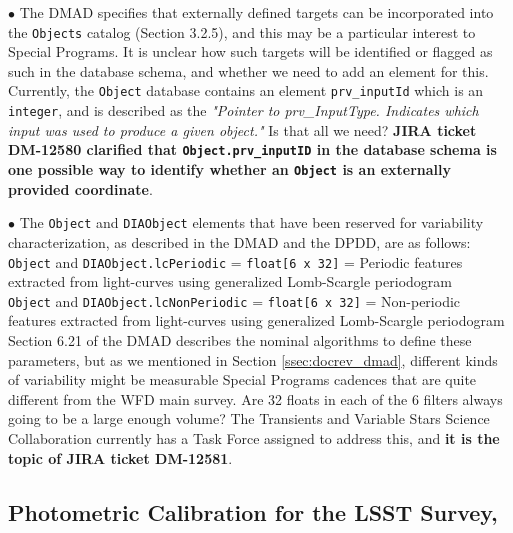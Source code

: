 $\bullet$ The DMAD specifies that externally defined targets can be incorporated into the \texttt{Objects} catalog (Section 3.2.5), and this may be a particular interest to Special Programs. It is unclear how such targets will be identified or flagged as such in the database schema, and whether we need to add an element for this. Currently, the \texttt{Object} database contains an element \texttt{prv\_inputId} which is an \texttt{integer}, and is described as the \textit{"Pointer to prv\_InputType. Indicates which input was used to produce a given object."} Is that all we need? {\bf JIRA ticket DM-12580 clarified that  \texttt{Object.prv\_inputID} in the database schema is one possible way to identify whether an \texttt{Object} is an externally provided coordinate}.

$\bullet$ The \texttt{Object} and \texttt{DIAObject} elements that have been reserved for variability characterization, as described in the DMAD and the DPDD, are as follows: \\
\texttt{Object} and \texttt{DIAObject.lcPeriodic} = \texttt{float[6 x 32]} = Periodic features extracted from light-curves using generalized Lomb-Scargle periodogram \\
\texttt{Object} and \texttt{DIAObject.lcNonPeriodic} = \texttt{float[6 x 32]} = Non-periodic features extracted from light-curves using generalized Lomb-Scargle periodogram \\
Section 6.21 of the DMAD describes the nominal algorithms to define these parameters, but as we mentioned in Section \ref{ssec:docrev_dmad}, different kinds of variability might be measurable Special Programs cadences that are quite different from the WFD main survey. Are 32 floats in each of the 6 filters always going to be a large enough volume? The Transients and Variable Stars Science Collaboration currently has a Task Force assigned to address this, and {\bf it is the topic of JIRA ticket DM-12581}.

\subsection{Photometric Calibration for the LSST Survey, }

